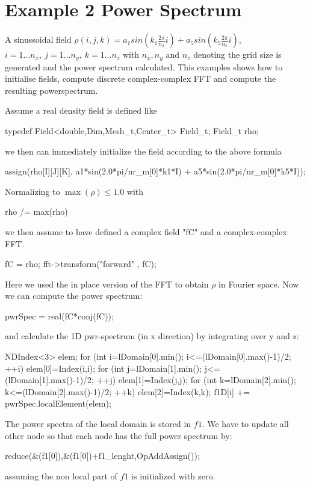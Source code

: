 \section{Example 2 Power Spectrum}
A sinussoidal field  $\rho(i,j,k) = a_1sin(k_1 \frac{2\pi}{n_x} i) + a_5 sin(k_5 \frac{2\pi}{n_x} i)$,
$i= 1 \dots n_x, ~ j= 1 \dots n_y, ~ k= 1 \dots n_z $ with $n_x,n_y$ and $n_z$ denoting the grid size is generated and
the power spectrum calculated. This examples shows how to initialise fields, compute discrete complex-complex FFT and
compute the resulting powerspectrum.

Assume a real density field is defined like
\begin{smallcode}
typedef Field<double,Dim,Mesh_t,Center_t>  Field_t;
Field_t rho;
\end{smallcode}
we then can immediately initialize the field according to the above formula
\begin{smallcode}
assign(rho[I][J][K], a1*sin(2.0*pi/nr_m[0]*k1*I) +
                     a5*sin(2.0*pi/nr_m[0]*k5*I));
\end{smallcode}
Normalizing to $\max(\rho) \le 1.0 $ with
\begin{smallcode}
rho /= max(rho)
\end{smallcode}
we then assume to have defined a complex field "fC" and a complex-complex FFT.
\begin{smallcode}
fC = rho;
fft->transform("forward" , fC);
 \end{smallcode}
Here we used the in place version of the FFT to obtain $\rho $ in Fourier space. Now
we can compute the power spectrum:
\begin{smallcode}
pwrSpec = real(fC*conj(fC));
\end{smallcode}
and calculate the 1D pwr-spectrum (in x direction) by integrating over y and z: \\
\begin{code}
 NDIndex<3> elem;
 for (int i=lDomain[0].min(); i<=(lDomain[0].max()-1)/2; ++i) {
  elem[0]=Index(i,i);
   for (int j=lDomain[1].min(); j<=(lDomain[1].max()-1)/2; ++j) {
    elem[1]=Index(j,j);
     for (int k=lDomain[2].min(); k<=(lDomain[2].max()-1)/2; ++k) {
       elem[2]=Index(k,k);
       f1D[i] += pwrSpec.localElement(elem);
     }
   }
 }
\end{code}
The power spectra of the local domain is stored in $f1$. We have to update all other node
so that each node has the full power spectrum by:
\begin{smallcode}
reduce(&(f1[0]),&(f1[0])+f1_lenght,OpAddAssign());
\end{smallcode}
assuming the non local part of $f1$ is initialized with zero.

